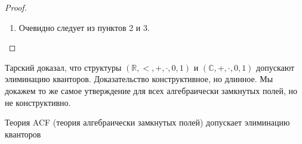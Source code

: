 \begin{proof}
\begin{enumerate}
       \begin{stat} 
        $T\cup\text{Diag}(\mathbb{C})\cup\{\varphi(\overline{d})\}$ имеет модель.
       \end{stat}
       \begin{proof}
           Доказываем от противного. Тогда для некоторого конечного подмножества $\Gamma$ $T\cup\{\delta_1(\overline{d}),\ldots,\delta_n(\overline{d}))\}\cup\{\varphi(\overline{d})\}$ не имеет модели. Значит $T\models \bigwedge\delta_i(\overline{d})\rightarrow\neg\varphi(\overline{d})$, откуда по контрпозиции $T\models \varphi(\overline{d})\rightarrow\bigvee\neg\delta_i(\overline{d})$.
           
           Тогда $\gamma=\bigvee\neg\delta_i(\overline{d})$ лежит в $\Gamma$. Значит $\mathbb{A}\models \gamma$, но по определению $\text{Diag}$ выполнено $\mathbb{A}\models \neg\gamma$. Противоречие
       \end{proof}
        
       Пусть $\mathbb{B}'$~— модель, удовлетворяющая утверждению. Рассмотрим её обеднение $\mathbb{B}$ до структуры $\sigma$. Существует единственное вложение $g: \mathbb{C}\rightarrow \mathbb{B}$, переводящее $d_i$ в $d_i'$.

       Наконец, воспользуемся условием $\circledast$. По определению, в $\mathbb{A}$ $\varphi(f(\overline{d}))$ ложно, а в $\mathbb{B}$ $\varphi(g(\overline{d}))$ истинно. Противоречие.

    \item Очевидно следует из пунктов 2 и 3.
    \end{enumerate}
\end{proof}


Тарский доказал, что структуры $(\mathbb{R}, <, +, \cdot, 0, 1)$ и $(\mathbb{C}, +, \cdot, 0, 1)$ допускают элиминацию кванторов. Доказательство конструктивное, но длинное. Мы докажем то же самое утверждение для всех алгебраически замкнутых полей, но не конструктивно.

\begin{exmpl}
    Теория ACF (теория алгебраически замкнутых полей) допускает элиминацию кванторов
\end{exmpl}

